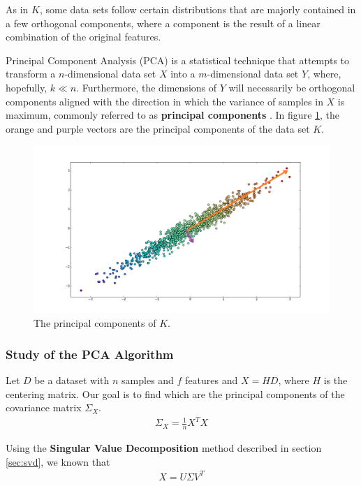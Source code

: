 \documentclass[12pt]{article}
\begin{document}
As in $K$, some data sets follow certain distributions that are majorly contained in a few orthogonal components, where a component is the result of a linear combination of the original features.

Principal Component Analysis (PCA) is a statistical technique that attempts to transform a $n$-dimensional data set $X$ into a $m$-dimensional data set $Y$, where, hopefully, $k \ll n$. Furthermore, the dimensions of $Y$ will necessarily be orthogonal components aligned with the direction in which the variance of samples in $X$ is maximum, commonly referred to as \textbf{principal components} \cite{pca1989}. In figure \ref{fig:datasetrpc}, the orange and purple vectors are the principal components of the data set $K$.

\begin{figure}[H]
	\centering
	\captionsetup{justification=centering}
	\includegraphics[width=.8\linewidth]{datasetrpc}
	\caption{The principal components of $K$.}
	\label{fig:datasetrpc}
\end{figure}

\subsubsection{Study of the PCA Algorithm}

Let $D$ be a dataset with $n$ samples and $f$ features and $X=HD$, where $H$ is the centering matrix. Our goal is to find which are the principal components of the covariance matrix $\Sigma_X$.
\begin{align}
	\label{eq:pca-cov}
	\Sigma_X=\frac{1}{n} X^TX
\end{align}

Using the \textbf{Singular Value Decomposition} method described in section \ref{sec:svd}, we known that
\begin{align}
	\label{eq:pca-svd}
	X = U\Sigma V^T
\end{align}
\end{document}
